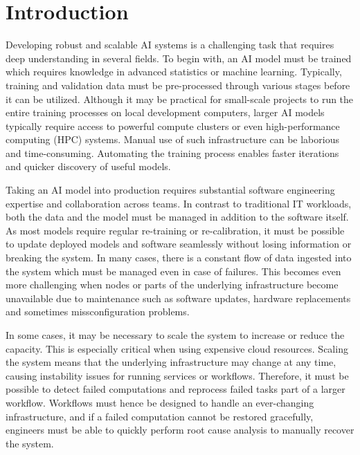 \documentclass{article}
\begin{document}

\section{Introduction}
Developing robust and scalable AI systems is a challenging task that requires deep understanding in several fields. To begin with, an AI model must be trained which requires knowledge in advanced statistics or machine learning. Typically, training and validation data must be pre-processed through various stages before it can be utilized. Although it may be practical for small-scale projects to run the entire training processes on local development computers, larger AI models typically require access to powerful compute clusters or even high-performance computing (HPC) systems. Manual use of such infrastructure can be laborious and time-consuming. Automating the training process enables faster iterations and quicker discovery of useful models.

Taking an AI model into production requires substantial software engineering expertise and collaboration across teams. In contrast to traditional IT workloads, both the data and the model must be managed in addition to the software itself. As most models require regular re-training or re-calibration, it must be possible to update deployed models and software seamlessly without losing information or breaking the system. In many cases, there is a constant flow of data ingested into the system which must be managed even in case of failures. This becomes even more challenging when nodes or parts of the underlying infrastructure become unavailable due to maintenance such as software updates, hardware replacements and sometimes missconfiguration problems.

In some cases, it may be necessary to scale the system to increase or reduce the capacity. This is especially critical when using expensive cloud resources. Scaling the system means that the underlying infrastructure may change at any time, causing instability issues for running services or workflows. Therefore, it must be possible to detect failed computations and reprocess failed tasks part of a larger workflow. Workflows must hence be designed to handle an ever-changing infrastructure, and if a failed computation cannot be restored gracefully, engineers must be able to quickly perform root cause analysis to manually recover the system.
\end{document}
